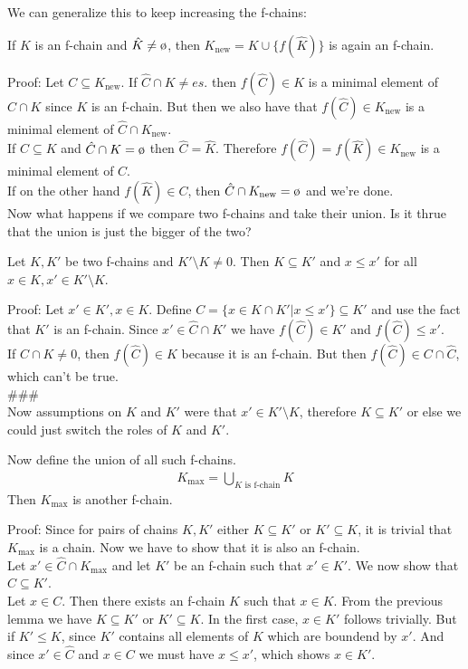 We can generalize this to keep increasing the f-chains: 
\begin{lemma}[]
	If $K$ is an f-chain and $\hat{K} \neq \es$, then $K_{\text{new}} = K \cup \{f(\hat{K})\}$ is again an f-chain.
\end{lemma}
Proof: Let $C \subseteq K_{\text{new}}$. If $\hat{C} \cap K \neq es$. then $f(\hat{C}) \in K$ is a minimal element of $\hat{C} \cap K$ since $K$ is an f-chain. But then we also have that $f(\hat{C}) \in K_{\text{new}}$ is a minimal element of $\hat{C} \cap K_{\text{new}}$.\\
If $C \subseteq K$ and $\hat{C} \cap K = \es$ then $\hat{C} = \hat{K}$. Therefore $f(\hat{C}) = f(\hat{K}) \in K_{\text{new}}$ is a minimal element of $C$.\\
If on the other hand $f(\hat{K}) \in C$, then $\hat{C} \cap K_{\text{new}} = \es$ and we're done.\\

Now what happens if we compare two f-chains and take their union. Is it thrue that the union is just the bigger of the two?
\begin{lemma}[]
Let $K,K'$ be two f-chains and $K' \setminus K \neq 0$. Then $K \subseteq K'$ and $x \leq x'$ for all $x \in K, x' \in K' \setminus K$.
\end{lemma}

Proof: Let $x' \in K', x\in K$. Define $C = \{x \in K \cap K' \big\vert x \leq x'\} \subseteq K'$ and use the fact that $K'$ is an f-chain. Since $x' \in \hat{C} \cap K'$ we have $f(\hat{C}) \in K'$ and $f(\hat{C}) \leq x'$.\\
If $\hat{C} \cap K \neq 0$, then $f(\hat{C}) \in K$ because it is an f-chain. But then $f(\hat{C}) \in C \cap \hat{C}$, which can't be true.\\
\#\#\#\\

Now assumptions on $K$ and $K'$ were that $x' \in K' \setminus K$, therefore $K \subseteq K'$ or else we could just switch the roles of $K$ and $K'$.\\


\begin{lemma}[]
Now define the union of all such f-chains.
\begin{align*}
K_{\text{max}} = \bigcup_{K \text{ is f-chain}}K
\end{align*}
Then $K_{\text{max}}$ is another f-chain.
\end{lemma}

Proof: Since for pairs of chains $K,K'$ either $K \subseteq K'$ or $K' \subseteq K$, it is trivial that $K_{\text{max}}$ is a chain. Now we have to show that it is also an f-chain.\\
Let $x' \in \hat{C} \cap K_{\text{max}}$ and let $K'$ be an f-chain such that $x' \in K'$. We now show that $C \subseteq K'$.\\
Let $x \in C$. Then there exists an f-chain $K$ such that $x \in K$. From the previous lemma we have $K \subseteq K'$ or $K' \subseteq K$.
In the first case, $x \in K'$ follows trivially. But if $K' \leq K$, since $K'$ contains all elements of $K$ which are boundend by $x'$. And since $x' \in \hat{C}$ and $x \in C$ we must have $x \leq x'$, which shows $x \in K'$.\\

